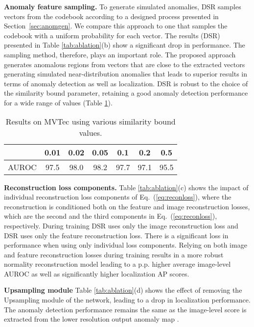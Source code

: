 \documentclass[runningheads]{llncs}
\begin{document}
\textbf{Anomaly feature sampling.} 
To generate simulated anomalies, DSR samples vectors from the codebook  according to a designed process presented in Section~\ref{sec:anomgen}. We compare this approach to one that samples the codebook with a uniform probability for each vector. The results (DSR) presented in Table \ref{tab:ablation}(b) show a significant drop in performance. The sampling method, therefore, plays an important role. The proposed approach generates anomalous regions from vectors that are close to the extracted vectors generating simulated near-distribution anomalies that leads to superior results in terms of anomaly detection as well as localization. DSR is robust to the choice of the similarity bound parameter, retaining a good anomaly detection performance for a wide range of  values (Table \ref{tab:simBound}).
\begin{table}
\centering
\begin{tabular}{c |  c c c c c c }\hline
  & 0.01 & 0.02 & 0.05 & 0.1 & 0.2 & 0.5 \\ \hline
 AUROC & 97.5 & 98.0 & 98.2 & 97.7 & 97.1 & 95.5 \\
\end{tabular}
\caption{Results on MVTec using various similarity bound  values. 
}
\label{tab:simBound}
\end{table}



\textbf{Reconstruction loss components.} 
Table \ref{tab:ablation}(c) shows the impact of individual reconstruction loss components of Eq.~(\ref{eq:reconloss}), where the reconstruction is conditioned both on the feature  and image  reconstruction losses, which are the second and the third components in Eq.~(\ref{eq:reconloss}), respectively. During training DSR uses only the image reconstruction loss and DSR uses only the feature reconstruction loss. There is a significant loss in performance when using only individual loss components. Relying on both image and feature reconstruction losses during training results in a more robust normality reconstruction model leading to a  p.p. higher average image-level AUROC as well as significantly higher localization AP scores.

\textbf{Upsampling module}
Table \ref{tab:ablation}(d) shows the effect of removing the Upsampling module of the network, leading to a drop in localization performance. The anomaly detection performance remains the same as the image-level score is extracted from the lower resolution output anomaly map .
\end{document}
